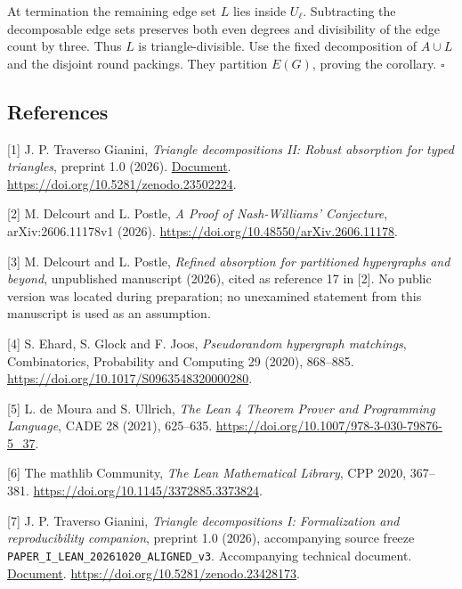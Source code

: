 \documentclass[english,11pt,a4paper]{article}
\begin{document}
At termination the remaining edge set \(L\) lies inside \(U_\ell\). Subtracting the decomposable edge sets preserves both even degrees and divisibility of the edge count by three. Thus \(L\) is triangle-divisible. Use the fixed decomposition of \(A\cup L\) and the disjoint round packings. They partition \(E(G)\), proving the corollary. \(\square\)

\subsection{References}\label{references}

\begingroup\small\raggedright
\setlength{\parskip}{3pt}

{[}1{]} J. P. Traverso Gianini, \emph{Triangle decompositions II: Robust absorption for typed triangles}, preprint 1.0 (2026). \href{https://github.com/jtraverso/nash-williams-triangle-decompositions-release/blob/main/preprints/PAPER_II/01_manuscript/PAPER_II_preprint_v1.0_en.md}{Document}. \url{https://doi.org/10.5281/zenodo.23502224}.

{[}2{]} M. Delcourt and L. Postle, \emph{A Proof of Nash-Williams' Conjecture}, arXiv:2606.11178v1 (2026). \url{https://doi.org/10.48550/arXiv.2606.11178}.

{[}3{]} M. Delcourt and L. Postle, \emph{Refined absorption for partitioned hypergraphs and beyond}, unpublished manuscript (2026), cited as reference 17 in {[}2{]}. No public version was located during preparation; no unexamined statement from this manuscript is used as an assumption.

{[}4{]} S. Ehard, S. Glock and F. Joos, \emph{Pseudorandom hypergraph matchings}, Combinatorics, Probability and Computing 29 (2020), 868--885. \url{https://doi.org/10.1017/S0963548320000280}.

{[}5{]} L. de Moura and S. Ullrich, \emph{The Lean 4 Theorem Prover and Programming Language}, CADE 28 (2021), 625--635. \url{https://doi.org/10.1007/978-3-030-79876-5_37}.

{[}6{]} The mathlib Community, \emph{The Lean Mathematical Library}, CPP 2020, 367--381. \url{https://doi.org/10.1145/3372885.3373824}.

{[}7{]} J. P. Traverso Gianini, \emph{Triangle decompositions I: Formalization and reproducibility companion}, preprint 1.0 (2026), accompanying source freeze \texttt{PAPER\_\allowbreak{}I\_\allowbreak{}LEAN\_\allowbreak{}20261020\_\allowbreak{}ALIGNED\_\allowbreak{}v3}. Accompanying technical document. \href{https://github.com/jtraverso/nash-williams-triangle-decompositions-release/blob/main/preprints/PAPER_I/05_formalization/FORMALIZATION_COMPANION_preprint_v1.0_en.md}{Document}. \url{https://doi.org/10.5281/zenodo.23428173}.
\end{document}
